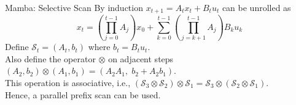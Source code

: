 \documentclass[xcolor=dvipsnames,aspectratio=169]{beamer}
\begin{document}
            \begin{frame}{Mamba: Selective Scan}
                By induction $x_{t + 1} = A_{t} x_{t} + B_{t} u_{t}$ can be unrolled as 
                $$x_t = (\prod_{j=0}^{t-1} A_j) x_0 + \sum_{k=0}^{t-1} (\prod_{j=k+1}^{t-1} A_j) B_k u_k$$
                Define $\mathcal{S}_t = (A_t,b_t)$ where $ b_t = B_t u_t$. \\
                Also define the operator $\otimes$ on adjacent steps $(A_2,b_2) \otimes (A_1,b_1) = (A_2A_1,\; b_2 + A_2 b_1)$. \\
                This operation is associative, i.e., $(\mathcal{S}_3\otimes\mathcal{S}_2)\otimes\mathcal{S}_1=\mathcal{S}_3\otimes(\mathcal{S}_2\otimes\mathcal{S}_1)$. \\
                Hence, a parallel prefix scan can be used.
            \end{frame}    
            
\end{document}
